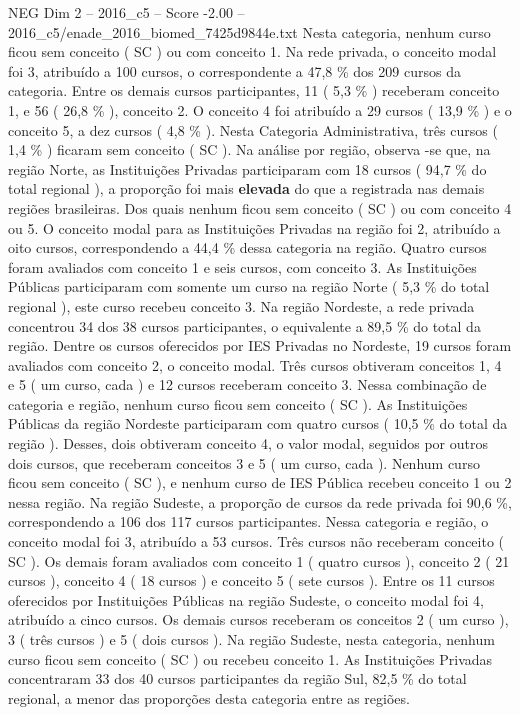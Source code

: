 \begin{textsample}{NEG Dim 2 – 2016\_c5 – Score -2.00 – 2016\_c5/enade\_2016\_biomed\_7425d9844e.txt}
Nesta categoria, nenhum curso ficou sem conceito ( SC ) ou com conceito 1.
Na rede privada, o conceito modal foi 3, atribuído a 100 cursos, o correspondente a 47,8 \% dos 209 cursos da categoria.
Entre os demais cursos participantes, 11 ( 5,3 \% ) receberam conceito 1, e 56 ( 26,8 \% ), conceito 2.
O conceito 4 foi atribuído a 29 cursos ( 13,9 \% ) e o conceito 5, a dez cursos ( 4,8 \% ).
Nesta Categoria Administrativa, três cursos ( 1,4 \% ) ficaram sem conceito ( SC ).
Na análise por região, observa -se que, na região Norte, as Instituições Privadas participaram com 18 cursos ( 94,7 \% do total regional ), a proporção foi mais \textbf{elevada} do que a registrada nas demais regiões brasileiras.
Dos quais nenhum ficou sem conceito ( SC ) ou com conceito 4 ou 5.
O conceito modal para as Instituições Privadas na região foi 2, atribuído a oito cursos, correspondendo a 44,4 \% dessa categoria na região.
Quatro cursos foram avaliados com conceito 1 e seis cursos, com conceito 3.
As Instituições Públicas participaram com somente um curso na região Norte ( 5,3 \% do total regional ), este curso recebeu conceito 3.
Na região Nordeste, a rede privada concentrou 34 dos 38 cursos participantes, o equivalente a 89,5 \% do total da região.
Dentre os cursos oferecidos por IES Privadas no Nordeste, 19 cursos foram avaliados com conceito 2, o conceito modal.
Três cursos obtiveram conceitos 1, 4 e 5 ( um curso, cada ) e 12 cursos receberam conceito 3.
Nessa combinação de categoria e região, nenhum curso ficou sem conceito ( SC ).
As Instituições Públicas da região Nordeste participaram com quatro cursos ( 10,5 \% do total da região ).
Desses, dois obtiveram conceito 4, o valor modal, seguidos por outros dois cursos, que receberam conceitos 3 e 5 ( um curso, cada ).
Nenhum curso ficou sem conceito ( SC ), e nenhum curso de IES Pública recebeu conceito 1 ou 2 nessa região.
Na região Sudeste, a proporção de cursos da rede privada foi 90,6 \%, correspondendo a 106 dos 117 cursos participantes.
Nessa categoria e região, o conceito modal foi 3, atribuído a 53 cursos.
Três cursos não receberam conceito ( SC ).
Os demais foram avaliados com conceito 1 ( quatro cursos ), conceito 2 ( 21 cursos ), conceito 4 ( 18 cursos ) e conceito 5 ( sete cursos ).
Entre os 11 cursos oferecidos por Instituições Públicas na região Sudeste, o conceito modal foi 4, atribuído a cinco cursos.
Os demais cursos receberam os conceitos 2 ( um curso ), 3 ( três cursos ) e 5 ( dois cursos ).
Na região Sudeste, nesta categoria, nenhum curso ficou sem conceito ( SC ) ou recebeu conceito 1.
As Instituições Privadas concentraram 33 dos 40 cursos participantes da região Sul, 82,5 \% do total regional, a menor das proporções desta categoria entre as regiões.

\end{textsample}
